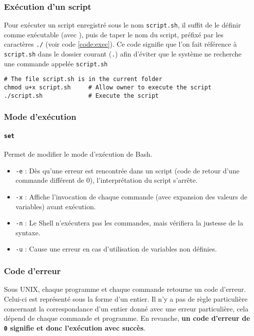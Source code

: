 \subsubsection{Exécution d'un script}
Pour exécuter un script enregistré sous le nom \texttt{script.sh}, il suffit de le définir comme exécutable (avec ), puis de taper le nom du script, préfixé par les caractères \texttt{./} (voir code \ref{code:exec}). Ce code signifie que l'on fait référence à \texttt{script.sh} dans le dossier courant (\texttt{.}) afin d'éviter que le système ne recherche une commande appelée \texttt{script.sh}

\begin{code}
    \begin{verbatim}
# The file script.sh is in the current folder
chmod u+x script.sh     # Allow owner to execute the script
./script.sh             # Execute the script
    \end{verbatim}
    
    \vspace{-0.5cm}
    \label{code:exec}
\end{code}

\subsubsection{Mode d'exécution}

\paragraph{\texttt{set}} 
Permet de modifier le mode d'exécution de Bash. 
\begin{itemize}
    \item \texttt{-e} : Dès qu'une erreur est rencontrée dans un script (code de retour d'une commande différent de 0), l'interprétation du script s'arrête.
    \item \texttt{-x} : Affiche l'invocation de chaque commande (avec expansion des valeurs de variables) avant exécution.
    \item \texttt{-n} : Le Shell n'exécutera pas les commandes, mais vérifiera la justesse de la syntaxe.
    \item \texttt{-u} : Cause une erreur en cas d'utilisation de variables non définies.
\end{itemize}

\subsubsection{Code d'erreur} \label{sec:error}
Sous UNIX, chaque programme et chaque commande retourne un code d'erreur. Celui-ci est représenté sous la forme d'un entier. Il n'y a pas de règle particulière concernant la correspondance d'un entier donné avec une erreur particulière, cela dépend de chaque commande et programme. En revanche, \textbf{un code d'erreur de \texttt{0} signifie  et donc l'exécution avec succès}.

